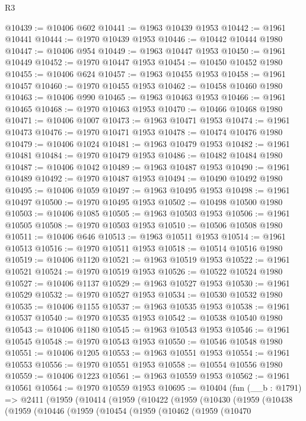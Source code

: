 \begin{lexlean}{R3}
\begin{coremodule}
@10439 := @10406 @602
@10441 := @1963 @10439 @1953
@10442 := @1961 @10441
@10444 := @1970 @10439 @1953
@10446 := @10442 @10444 @1980
@10447 := @10406 @954
@10449 := @1963 @10447 @1953
@10450 := @1961 @10449
@10452 := @1970 @10447 @1953
@10454 := @10450 @10452 @1980
@10455 := @10406 @624
@10457 := @1963 @10455 @1953
@10458 := @1961 @10457
@10460 := @1970 @10455 @1953
@10462 := @10458 @10460 @1980
@10463 := @10406 @990
@10465 := @1963 @10463 @1953
@10466 := @1961 @10465
@10468 := @1970 @10463 @1953
@10470 := @10466 @10468 @1980
@10471 := @10406 @1007
@10473 := @1963 @10471 @1953
@10474 := @1961 @10473
@10476 := @1970 @10471 @1953
@10478 := @10474 @10476 @1980
@10479 := @10406 @1024
@10481 := @1963 @10479 @1953
@10482 := @1961 @10481
@10484 := @1970 @10479 @1953
@10486 := @10482 @10484 @1980
@10487 := @10406 @1042
@10489 := @1963 @10487 @1953
@10490 := @1961 @10489
@10492 := @1970 @10487 @1953
@10494 := @10490 @10492 @1980
@10495 := @10406 @1059
@10497 := @1963 @10495 @1953
@10498 := @1961 @10497
@10500 := @1970 @10495 @1953
@10502 := @10498 @10500 @1980
@10503 := @10406 @1085
@10505 := @1963 @10503 @1953
@10506 := @1961 @10505
@10508 := @1970 @10503 @1953
@10510 := @10506 @10508 @1980
@10511 := @10406 @646
@10513 := @1963 @10511 @1953
@10514 := @1961 @10513
@10516 := @1970 @10511 @1953
@10518 := @10514 @10516 @1980
@10519 := @10406 @1120
@10521 := @1963 @10519 @1953
@10522 := @1961 @10521
@10524 := @1970 @10519 @1953
@10526 := @10522 @10524 @1980
@10527 := @10406 @1137
@10529 := @1963 @10527 @1953
@10530 := @1961 @10529
@10532 := @1970 @10527 @1953
@10534 := @10530 @10532 @1980
@10535 := @10406 @1155
@10537 := @1963 @10535 @1953
@10538 := @1961 @10537
@10540 := @1970 @10535 @1953
@10542 := @10538 @10540 @1980
@10543 := @10406 @1180
@10545 := @1963 @10543 @1953
@10546 := @1961 @10545
@10548 := @1970 @10543 @1953
@10550 := @10546 @10548 @1980
@10551 := @10406 @1205
@10553 := @1963 @10551 @1953
@10554 := @1961 @10553
@10556 := @1970 @10551 @1953
@10558 := @10554 @10556 @1980
@10559 := @10406 @1223
@10561 := @1963 @10559 @1953
@10562 := @1961 @10561
@10564 := @1970 @10559 @1953
@10695 := @10404
    (fun (__b : @1791) =>
    @2411
      (@1959
        (@10414
          (@1959
            (@10422
              (@1959
                (@10430
                  (@1959
                    (@10438
                      (@1959
                        (@10446
                          (@1959
                            (@10454
                              (@1959
                                (@10462
                                  (@1959
                                    (@10470

\end{coremodule}
\end{lexlean}
